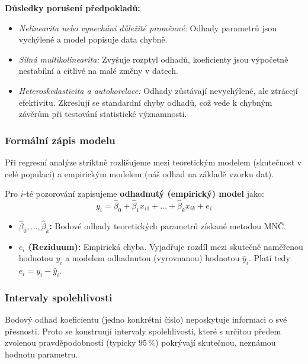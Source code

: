 \textbf{Důsledky porušení předpokladů:}
\begin{itemize}
    \item \textit{Nelinearita nebo vynechání důležité proměnné:} Odhady parametrů jsou vychýlené a model popisuje data chybně.
    \item \textit{Silná multikolinearita:} Zvyšuje rozptyl odhadů, koeficienty jsou výpočetně nestabilní a citlivé na malé změny v datech.
    \item \textit{Heteroskedasticita a autokorelace:} Odhady zůstávají nevychýlené, ale ztrácejí efektivitu. Zkreslují se standardní chyby odhadů, což vede k chybným závěrům při testování statistické významnosti.
\end{itemize}

\subsubsection*{Formální zápis modelu}
Při regresní analýze striktně rozlišujeme mezi teoretickým modelem (skutečnost v celé populaci) a empirickým modelem (náš odhad na základě vzorku dat).

Pro $i$-té pozorování zapisujeme \textbf{odhadnutý (empirický) model} jako:
$$y_i = \hat{\beta}_0 + \hat{\beta}_1 x_{i1} + \dots + \hat{\beta}_k x_{ik} + e_i$$
\begin{itemize}
    \item \textbf{$\hat{\beta}_0, \dots, \hat{\beta}_k$:} Bodové odhady teoretických parametrů získané metodou MNČ.
    \item \textbf{$e_i$ (Reziduum):} Empirická chyba. Vyjadřuje rozdíl mezi skutečně naměřenou hodnotou $y_i$ a modelem odhadnutou (vyrovnanou) hodnotou $\hat{y}_i$. Platí tedy $e_i = y_i - \hat{y}_i$.
\end{itemize}

\subsubsection*{Intervaly spolehlivosti}
Bodový odhad koeficientu (jedno konkrétní číslo) neposkytuje informaci o své přesnosti. Proto se konstruují intervaly spolehlivosti, které s určitou předem zvolenou pravděpodobností (typicky $95\,\%$) pokrývají skutečnou, neznámou hodnotu parametru.

